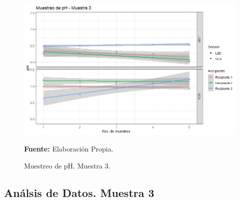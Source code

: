 \begin{figure}[H]
        \centering
        \includegraphics[width=0.75\linewidth]{Imagenes/cap4/pH_M3.png}
        \caption {Muestreo de pH. Muestra 3. }{\textbf{Fuente:}
        Elaboraci\'on Propia. }
        \label{fig:M3PH}
\end{figure}

\subsection{An\'alsis de Datos. Muestra 3}


